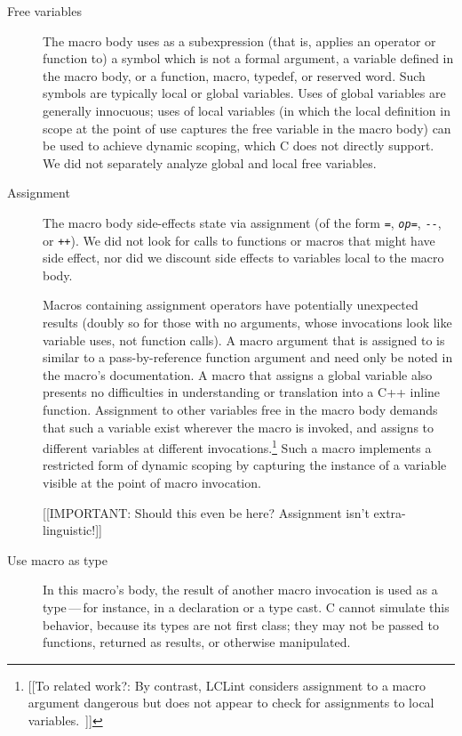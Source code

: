 \label{desc:properties}

\begin{description}
\item[Free variables]
  The macro body uses as a subexpression (that is, applies an operator or
  function to) a symbol which is not a formal argument, a variable defined
  in the macro body, or a function, macro, typedef, or reserved word.  Such
  symbols are typically local or global variables.  Uses of global
  variables are generally innocuous; uses of local variables (in which the
  local definition in scope at the point of use captures the free variable
  in the macro body) can be used to achieve dynamic scoping, which C does
  not directly support.  We did not separately analyze global and local
  free variables.

\item[Assignment]
  The macro body side-effects state via assignment (of the form {\tt =},
  {\tt {\em op}=}, {\tt -{}-}, or {\tt ++}).  We did not look for calls to
  functions or macros that might have side effect, nor did we discount side
  effects to variables local to the macro body.  
  
  Macros containing assignment operators have potentially unexpected
  results (doubly so for those with no arguments, whose invocations look
  like variable uses, not function calls).  A macro argument that is
  assigned to is similar to a pass-by-reference function argument and need
  only be noted in the macro's documentation.  A macro that assigns a
  global variable also presents no difficulties in understanding or
  translation into a C++ inline function.  Assignment to other variables
  free in the macro body demands that such a variable exist wherever the
  macro is invoked, and assigns to different variables at different
  invocations.\footnote{[[To related work?: By contrast, LCLint considers
    assignment to a macro argument dangerous but does not appear to check
    for assignments to local variables.~\cite{Evans:LCLint}]]} Such a macro
  implements a restricted form of dynamic scoping by capturing the instance
  of a variable visible at the point of macro invocation.

[[IMPORTANT:  Should this even be here?  Assignment isn't extra-linguistic!]]

\item[Use macro as type]
  In this macro's body, the result of another macro invocation is used as a
  type\,---\,for instance, in a declaration or a type cast.  C cannot
  simulate this behavior, because its types are not first class; they may
  not be passed to functions, returned as results, or otherwise
  manipulated.


\end{description}
